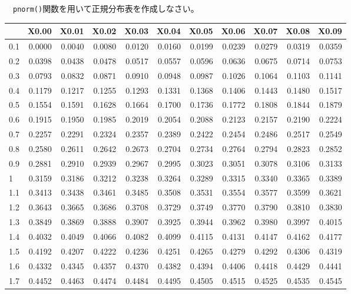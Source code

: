 \documentclass[]{tufte-handout}
\begin{document}
　\texttt{pnorm()}関数を用いて正規分布表を作成しなさい。

\begin{longtable}[]{@{}lrrrrrrrrrr@{}}
\toprule
& X0.00 & X0.01 & X0.02 & X0.03 & X0.04 & X0.05 & X0.06 & X0.07 & X0.08
& X0.09 \\
\midrule
\endhead
0.1 & 0.0000 & 0.0040 & 0.0080 & 0.0120 & 0.0160 & 0.0199 & 0.0239 &
0.0279 & 0.0319 & 0.0359 \\
0.2 & 0.0398 & 0.0438 & 0.0478 & 0.0517 & 0.0557 & 0.0596 & 0.0636 &
0.0675 & 0.0714 & 0.0753 \\
0.3 & 0.0793 & 0.0832 & 0.0871 & 0.0910 & 0.0948 & 0.0987 & 0.1026 &
0.1064 & 0.1103 & 0.1141 \\
0.4 & 0.1179 & 0.1217 & 0.1255 & 0.1293 & 0.1331 & 0.1368 & 0.1406 &
0.1443 & 0.1480 & 0.1517 \\
0.5 & 0.1554 & 0.1591 & 0.1628 & 0.1664 & 0.1700 & 0.1736 & 0.1772 &
0.1808 & 0.1844 & 0.1879 \\
0.6 & 0.1915 & 0.1950 & 0.1985 & 0.2019 & 0.2054 & 0.2088 & 0.2123 &
0.2157 & 0.2190 & 0.2224 \\
0.7 & 0.2257 & 0.2291 & 0.2324 & 0.2357 & 0.2389 & 0.2422 & 0.2454 &
0.2486 & 0.2517 & 0.2549 \\
0.8 & 0.2580 & 0.2611 & 0.2642 & 0.2673 & 0.2704 & 0.2734 & 0.2764 &
0.2794 & 0.2823 & 0.2852 \\
0.9 & 0.2881 & 0.2910 & 0.2939 & 0.2967 & 0.2995 & 0.3023 & 0.3051 &
0.3078 & 0.3106 & 0.3133 \\
1 & 0.3159 & 0.3186 & 0.3212 & 0.3238 & 0.3264 & 0.3289 & 0.3315 &
0.3340 & 0.3365 & 0.3389 \\
1.1 & 0.3413 & 0.3438 & 0.3461 & 0.3485 & 0.3508 & 0.3531 & 0.3554 &
0.3577 & 0.3599 & 0.3621 \\
1.2 & 0.3643 & 0.3665 & 0.3686 & 0.3708 & 0.3729 & 0.3749 & 0.3770 &
0.3790 & 0.3810 & 0.3830 \\
1.3 & 0.3849 & 0.3869 & 0.3888 & 0.3907 & 0.3925 & 0.3944 & 0.3962 &
0.3980 & 0.3997 & 0.4015 \\
1.4 & 0.4032 & 0.4049 & 0.4066 & 0.4082 & 0.4099 & 0.4115 & 0.4131 &
0.4147 & 0.4162 & 0.4177 \\
1.5 & 0.4192 & 0.4207 & 0.4222 & 0.4236 & 0.4251 & 0.4265 & 0.4279 &
0.4292 & 0.4306 & 0.4319 \\
1.6 & 0.4332 & 0.4345 & 0.4357 & 0.4370 & 0.4382 & 0.4394 & 0.4406 &
0.4418 & 0.4429 & 0.4441 \\
1.7 & 0.4452 & 0.4463 & 0.4474 & 0.4484 & 0.4495 & 0.4505 & 0.4515 &
0.4525 & 0.4535 & 0.4545 \\

\end{longtable}
\end{document}
